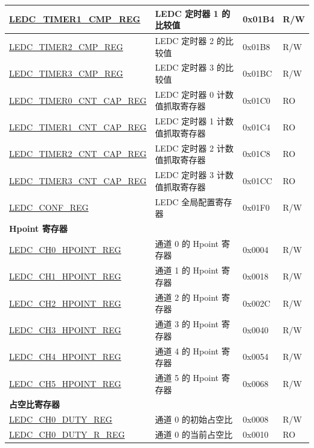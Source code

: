 \begin{longtable}{ | p{6cm} | p{7.2cm} | p{1.3cm} | p{1cm} | }
\hyperref[regdesc:LEDCTIMERXCMPREG]{LEDC\_TIMER1\_CMP\_REG} & LEDC 定时器 1 的比较值 & 0x01B4 & R/W \\ \hline
\hyperref[regdesc:LEDCTIMERXCMPREG]{LEDC\_TIMER2\_CMP\_REG} & LEDC 定时器 2 的比较值 & 0x01B8 & R/W \\ \hline
\hyperref[regdesc:LEDCTIMERXCMPREG]{LEDC\_TIMER3\_CMP\_REG} & LEDC 定时器 3 的比较值 & 0x01BC & R/W \\ \hline
\hyperref[regdesc:LEDCTIMERXCNTCAPREG]{LEDC\_TIMER0\_CNT\_CAP\_REG} & LEDC 定时器 0 计数值抓取寄存器 & 0x01C0 & RO \\ \hline
\hyperref[regdesc:LEDCTIMERXCNTCAPREG]{LEDC\_TIMER1\_CNT\_CAP\_REG} & LEDC 定时器 1 计数值抓取寄存器 & 0x01C4 & RO \\ \hline
\hyperref[regdesc:LEDCTIMERXCNTCAPREG]{LEDC\_TIMER2\_CNT\_CAP\_REG} & LEDC 定时器 2 计数值抓取寄存器 & 0x01C8 & RO \\ \hline
\hyperref[regdesc:LEDCTIMERXCNTCAPREG]{LEDC\_TIMER3\_CNT\_CAP\_REG} & LEDC 定时器 3 计数值抓取寄存器 & 0x01CC & RO \\ \hline
\hyperref[regdesc:LEDCCONFREG]{LEDC\_CONF\_REG} & LEDC 全局配置寄存器 & 0x01F0 & R/W \\ \hline
\multicolumn{4}{|l|}{\textbf{Hpoint 寄存器}} \\ \hline
\hyperref[regdesc:LEDCCHNHPOINTREG]{LEDC\_CH0\_HPOINT\_REG} & 通道 0 的 Hpoint 寄存器 & 0x0004 & R/W \\ \hline
\hyperref[regdesc:LEDCCHNHPOINTREG]{LEDC\_CH1\_HPOINT\_REG} & 通道 1 的 Hpoint 寄存器 & 0x0018 & R/W \\ \hline
\hyperref[regdesc:LEDCCHNHPOINTREG]{LEDC\_CH2\_HPOINT\_REG} & 通道 2 的 Hpoint 寄存器 & 0x002C & R/W \\ \hline
\hyperref[regdesc:LEDCCHNHPOINTREG]{LEDC\_CH3\_HPOINT\_REG} & 通道 3 的 Hpoint 寄存器 & 0x0040 & R/W \\ \hline
\hyperref[regdesc:LEDCCHNHPOINTREG]{LEDC\_CH4\_HPOINT\_REG} & 通道 4 的 Hpoint 寄存器 & 0x0054 & R/W \\ \hline
\hyperref[regdesc:LEDCCHNHPOINTREG]{LEDC\_CH5\_HPOINT\_REG} & 通道 5 的 Hpoint 寄存器 & 0x0068 & R/W \\ \hline
\multicolumn{4}{|l|}{\textbf{占空比寄存器}} \\ \hline
\hyperref[regdesc:LEDCCHNDUTYREG]{LEDC\_CH0\_DUTY\_REG} & 通道 0 的初始占空比 & 0x0008 & R/W \\ \hline
\hyperref[regdesc:LEDCCHNDUTYRREG]{LEDC\_CH0\_DUTY\_R\_REG} & 通道 0 的当前占空比 & 0x0010 & RO \\ \hline

\end{longtable}
